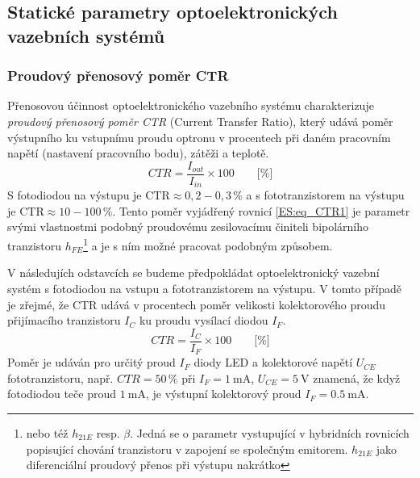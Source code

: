     \subsection{Statické parametry optoelektronických vazebních systémů}
      \subsubsection{Proudový přenosový poměr CTR}\label{ES:Opto_CTR}
        Přenosovou účinnost optoelektronického vazebního systému charakterizuje \emph{proudový
        přenosový poměr CTR} (Current Transfer Ratio), který udává poměr výstupního ku vstupnímu
        proudu optronu v procentech při daném pracovním napětí (nastavení pracovního bodu), zátěži a
        teplotě. 
        \begin{equation}\label{ES:eq_CTR1}
          CTR=\frac{I_{out}}{I_{in}}\times100  \qquad\text{[\%]} 
        \end{equation}
        S fotodiodou na výstupu je \(\text{CTR}\approx0,2-0,3\,\%\) a s fototranzistorem na výstupu
        je \(\text{CTR}\approx10-100\,\%\). Tento poměr vyjádřený rovnicí \ref{ES:eq_CTR1} je
        parametr svými vlastnostmi podobný proudovému zesilovacímu činiteli bipolárního tranzistoru
        \(h_{FE}\)\footnote{nebo též \(h_{21E}\) resp. \(\beta\). Jedná se o parametr vystupující
        v hybridních rovnicích popisující chování tranzistoru v zapojení se společným emitorem.
        \(h_{21E}\) jako diferenciální proudový přenos při výstupu nakrátko} a je s ním možné
        pracovat podobným způsobem.
               
        V následujích odstavcích se budeme předpokládat optoelektronický vazební systém s
        fotodiodou na vstupu a fototranzistorem na výstupu. V tomto případě je zřejmé, že CTR udává
        v procentech poměr velikosti kolektorového proudu přijímacího tranzistoru \(I_C\) ku proudu
        vysílací diodou \(I_F\).
        \begin{equation}\label{ES:eq_CTR2}
          CTR=\frac{I_{C}}{I_{F}}\times100  \qquad\text{[\%]} 
        \end{equation}
        Poměr je udáván pro určitý proud \(I_F\) diody LED a kolektorové napětí \(U_{CE}\)
        fototranzistoru, např. \(CTR = 50\,\%\) při \(I_F = \SI{1}{\milli\ampere}\), \(U_{CE} =
        \SI{5}{\volt}\) znamená, že když fotodiodou teče proud \(\SI{1}{\milli\ampere}\), je
        výstupní kolektorový proud \(I_F = \SI{0,5}{\milli\ampere}\).
        
